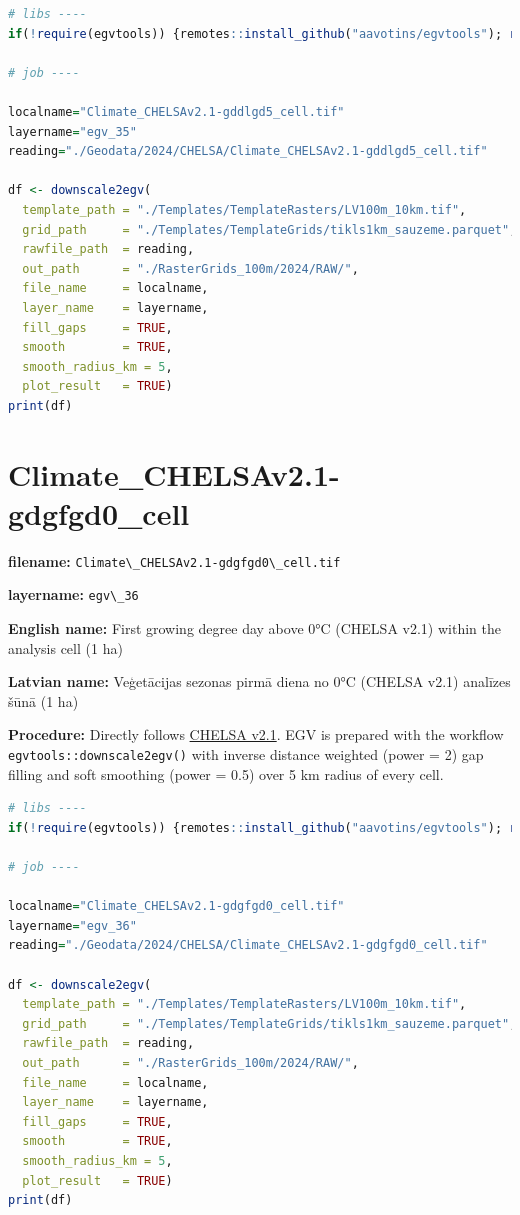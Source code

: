 \documentclass[
]{book}
\newcommand{\passthrough}[1]{#1}
\begin{document}
\begin{lstlisting}[language=R]
# libs ----
if(!require(egvtools)) {remotes::install_github("aavotins/egvtools"); require(egvtools)}

# job ----

localname="Climate_CHELSAv2.1-gddlgd5_cell.tif"
layername="egv_35"
reading="./Geodata/2024/CHELSA/Climate_CHELSAv2.1-gddlgd5_cell.tif"

df <- downscale2egv(
  template_path = "./Templates/TemplateRasters/LV100m_10km.tif",
  grid_path     = "./Templates/TemplateGrids/tikls1km_sauzeme.parquet",
  rawfile_path  = reading,
  out_path      = "./RasterGrids_100m/2024/RAW/",
  file_name     = localname,
  layer_name    = layername,
  fill_gaps     = TRUE,
  smooth        = TRUE,
  smooth_radius_km = 5,
  plot_result   = TRUE)
print(df)
\end{lstlisting}

\section{Climate\_CHELSAv2.1-gdgfgd0\_cell}\label{ch06.036}

\textbf{filename:} \passthrough{\lstinline!Climate\_CHELSAv2.1-gdgfgd0\_cell.tif!}

\textbf{layername:} \passthrough{\lstinline!egv\_36!}

\textbf{English name:} First growing degree day above 0°C (CHELSA v2.1) within the analysis cell (1 ha)

\textbf{Latvian name:} Veģetācijas sezonas pirmā diena no 0°C (CHELSA v2.1) analīzes šūnā (1 ha)

\textbf{Procedure:} Directly follows \hyperref[Ch04.11]{CHELSA v2.1}. EGV is prepared with the
workflow \passthrough{\lstinline!egvtools::downscale2egv()!} with inverse distance weighted (power = 2)
gap filling and soft smoothing (power = 0.5) over 5 km radius of every cell.

\begin{lstlisting}[language=R]
# libs ----
if(!require(egvtools)) {remotes::install_github("aavotins/egvtools"); require(egvtools)}

# job ----

localname="Climate_CHELSAv2.1-gdgfgd0_cell.tif"
layername="egv_36"
reading="./Geodata/2024/CHELSA/Climate_CHELSAv2.1-gdgfgd0_cell.tif"

df <- downscale2egv(
  template_path = "./Templates/TemplateRasters/LV100m_10km.tif",
  grid_path     = "./Templates/TemplateGrids/tikls1km_sauzeme.parquet",
  rawfile_path  = reading,
  out_path      = "./RasterGrids_100m/2024/RAW/",
  file_name     = localname,
  layer_name    = layername,
  fill_gaps     = TRUE,
  smooth        = TRUE,
  smooth_radius_km = 5,
  plot_result   = TRUE)
print(df)
\end{lstlisting}
\end{document}
